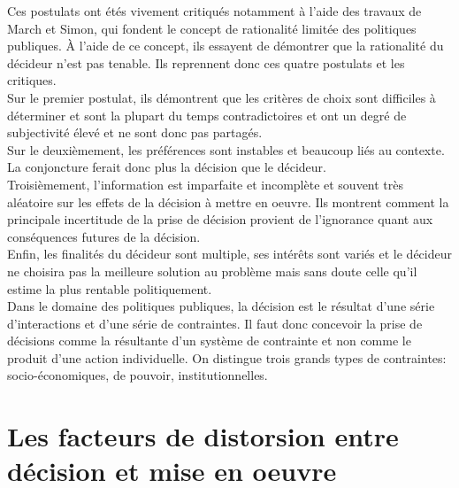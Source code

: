 \documentclass[10pt, a4paper, openany]{book}
\begin{document}
Ces postulats ont étés vivement critiqués notamment à l'aide des travaux de March et Simon, qui fondent le concept de rationalité limitée des politiques publiques. À l'aide de ce concept, ils essayent de démontrer que la rationalité du décideur n'est pas tenable. Ils reprennent donc ces quatre postulats et les critiques. \\
Sur le premier postulat, ils démontrent que les critères de choix sont difficiles à déterminer et sont la plupart du temps contradictoires et ont un degré de subjectivité élevé et ne sont donc pas partagés. \\
Sur le deuxièmement, les préférences sont instables et beaucoup liés au contexte. La conjoncture ferait donc plus la décision que le décideur. \\
Troisièmement, l'information est imparfaite et incomplète et souvent très aléatoire sur les effets de la décision à mettre en oeuvre. Ils montrent comment la principale incertitude de la prise de décision provient de l'ignorance quant aux conséquences futures de la décision. \\
Enfin, les finalités du décideur sont multiple, ses intérêts sont variés et le décideur ne choisira pas la meilleure solution au problème mais sans doute celle qu'il estime la plus rentable politiquement. \\
Dans le domaine des politiques publiques, la décision est le résultat d'une série d'interactions et d'une série de contraintes. Il faut donc concevoir la prise de décisions comme la résultante d'un système de contrainte et non comme le produit d'une action individuelle. On distingue trois grands types de contraintes: socio-économiques, de pouvoir, institutionnelles. 

\section{Les facteurs de distorsion entre décision et mise en oeuvre}
\end{document}

